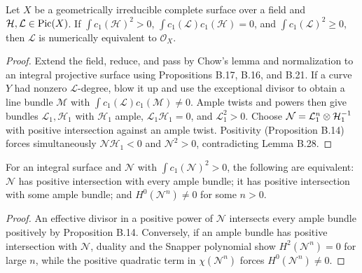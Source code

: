 \begin{theorem}\label{kps-thm-hodge-index}
Let $X$ be a geometrically irreducible complete surface over a field and
$\mathcal H,\mathcal L\in\operatorname{Pic}(X)$. If
$\int c_1(\mathcal H)^2>0$,
$\int c_1(\mathcal L)c_1(\mathcal H)=0$, and
$\int c_1(\mathcal L)^2\ge0$, then $\mathcal L$ is numerically equivalent to
$\mathcal O_X$.
\end{theorem}
\begin{proof}
Extend the field, reduce, and pass by Chow's lemma and normalization to an
integral projective surface using Propositions B.17, B.16, and B.21. If a
curve $Y$ had nonzero $\mathcal L$-degree, blow it up and use the exceptional
divisor to obtain a line bundle $\mathcal M$ with
$\int c_1(\mathcal L)c_1(\mathcal M)\ne0$. Ample twists and powers then give
bundles $\mathcal L_1,\mathcal H_1$ with $\mathcal H_1$ ample,
$\mathcal L_1\mathcal H_1=0$, and $\mathcal L_1^2>0$. Choose
$\mathcal N=\mathcal L_1^n\otimes\mathcal H_1^{-1}$ with positive intersection
against an ample twist. Positivity (Proposition B.14) forces simultaneously
$\mathcal N\mathcal H_1<0$ and $\mathcal N^2>0$, contradicting Lemma B.28.
\end{proof}

\begin{lemma}\label{kps-lem-positive-square}
For an integral surface and $\mathcal N$ with $\int c_1(\mathcal N)^2>0$,
the following are equivalent: $\mathcal N$ has positive intersection with
every ample bundle; it has positive intersection with some ample bundle; and
$H^0(\mathcal N^n)\ne0$ for some $n>0$.
\end{lemma}
\begin{proof}
An effective divisor in a positive power of $\mathcal N$ intersects every
ample bundle positively by Proposition B.14. Conversely, if an ample bundle
has positive intersection with $\mathcal N$, duality and the Snapper
polynomial show $H^2(\mathcal N^n)=0$ for large $n$, while the positive
quadratic term in $\chi(\mathcal N^n)$ forces $H^0(\mathcal N^n)\ne0$.
\end{proof}

